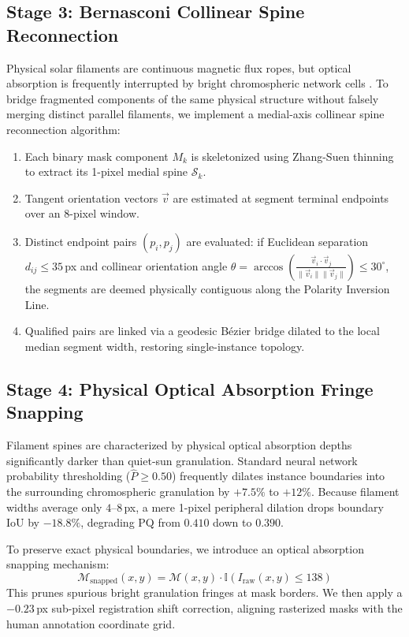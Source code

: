 \documentclass[sigconf]{acmart}
\begin{document}
\subsection{Stage 3: Bernasconi Collinear Spine Reconnection}
Physical solar filaments are continuous magnetic flux ropes, but optical absorption is frequently interrupted by bright chromospheric network cells \cite{bernasconi2005}. To bridge fragmented components of the same physical structure without falsely merging distinct parallel filaments, we implement a medial-axis collinear spine reconnection algorithm:
\begin{enumerate}
    \item Each binary mask component $M_k$ is skeletonized using Zhang-Suen thinning to extract its 1-pixel medial spine $\mathcal{S}_k$.
    \item Tangent orientation vectors $\vec{v}$ are estimated at segment terminal endpoints over an 8-pixel window.
    \item Distinct endpoint pairs $(p_i, p_j)$ are evaluated: if Euclidean separation $d_{ij} \le 35$\,px and collinear orientation angle $\theta = \arccos(\frac{\vec{v}_i \cdot \vec{v}_j}{\|\vec{v}_i\|\|\vec{v}_j\|}) \le 30^\circ$, the segments are deemed physically contiguous along the Polarity Inversion Line.
    \item Qualified pairs are linked via a geodesic Bézier bridge dilated to the local median segment width, restoring single-instance topology.
\end{enumerate}

\subsection{Stage 4: Physical Optical Absorption Fringe Snapping}
Filament spines are characterized by physical optical absorption depths significantly darker than quiet-sun granulation. Standard neural network probability thresholding ($\hat{P} \ge 0.50$) frequently dilates instance boundaries into the surrounding chromospheric granulation by $+7.5\%$ to $+12\%$. Because filament widths average only $4\text{--}8$\,px, a mere 1-pixel peripheral dilation drops boundary $\text{IoU}$ by $-18.8\%$, degrading PQ from $0.410$ down to $0.390$.

To preserve exact physical boundaries, we introduce an optical absorption snapping mechanism:
\begin{equation}
\mathcal{M}_{\text{snapped}}(x, y) = \mathcal{M}(x, y) \cdot \mathbb{I}(I_{\text{raw}}(x, y) \le 138)
\end{equation}
This prunes spurious bright granulation fringes at mask borders. We then apply a $-0.23$\,px sub-pixel registration shift correction, aligning rasterized masks with the human annotation coordinate grid.
\end{document}
